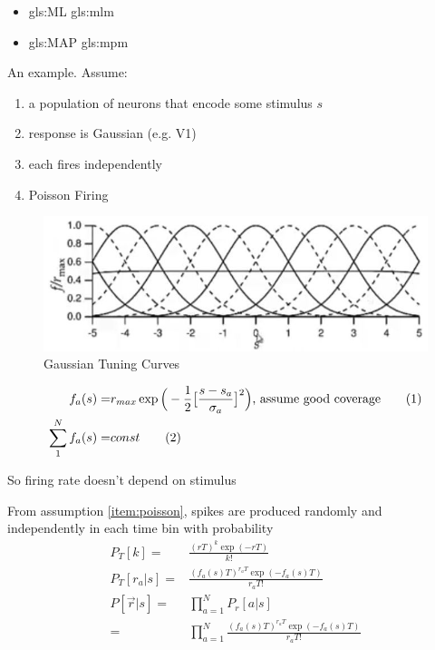 \documentclass[]{article}
\newcommand\numberthis{\addtocounter{equation}{1}\tag{\theequation}}
\begin{document}
\begin{itemize}
	\item \gls{gls:ML} \gls{gls:mlm}
	\item \gls{gls:MAP} \gls{gls:mpm}
\end{itemize}
 An example. Assume:
 
\begin{enumerate}
	\item a population of neurons that encode some stimulus $s$
	\item response is Gaussian (e.g. V1)
	\item each fires independently
	\item Poisson Firing\label{item:poisson}
\end{enumerate}

\begin{figure}[H]
	\caption{Gaussian Tuning Curves}
	\includegraphics[width=\textwidth]{decode-stimulus}
\end{figure}

\begin{align*}
	f_a(s) =& r_{max} \exp \Big(-\frac{1}{2}\big[\frac{s-s_a}{\sigma_a}\big]^2\Big)\text{, assume good coverage} \numberthis \label{eq:gauss}\\
	\sum_{1}^{N} f_a(s) =& const \numberthis \label{eq:good:coverage}
\end{align*}

So firing rate doesn't depend on stimulus

From assumption \ref{item:poisson}, spikes are produced randomly and independently in each time bin with probability
\begin{align*}
	P_T[k] =& \frac{(rT)^k \exp (-rT)}{k!}\\
	P_T[r_a\vert s] =& \frac{(f_a(s)T)^{r_aT} \exp (-f_a(s)T)}{r_aT!}\\
	P[\vec{r}\vert s] =& \prod_{a=1}^{N}P_r[a\vert s]\\
	=& \prod_{a=1}^{N} \frac{(f_a(s)T)^{r_aT} \exp (-f_a(s)T)}{r_aT!}
\end{align*}
\end{document}
